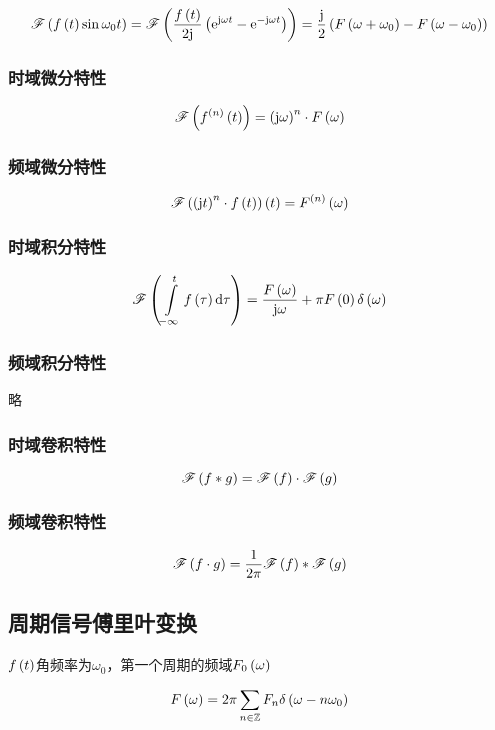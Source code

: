 \documentclass{article}
\begin{document}
\[\fourier{\ft\sin\omega_0t}
    =\fourier{\frac\ft{2\j}\pare{\e^{\j\omega t}-\e^{-\j\omega t}}}
    =\frac\j2\pare{F\pare{\omega+\omega_0}-F\pare{\omega-\omega_0}}\]

\subsubsection{时域微分特性}

\[\fourier{f^{\pare{n}}\pare{t}}=\pare{\j\omega}^n\cdot \fw\]

\subsubsection{频域微分特性}

\[\fourier{\pare{\j t}^n\cdot\ft}\pare{t}=F^{\pare{n}}\pare{\omega}\]

\subsubsection{时域积分特性}

\[\fourier{\int\limits_{-\infty}^tf\pare{\tau}\d\tau}=\frac{\fw}{\j\omega}+\pi F\pare{0}\delta\pare{\omega}\]

\subsubsection{频域积分特性}

略

\subsubsection{时域卷积特性}

\[\fourier{f\ast g}=\fourier f\cdot\fourier g\]

\subsubsection{频域卷积特性}

\[\fourier{f\cdot g}=\frac1{2\pi}\fourier f\ast\fourier g\]

\subsection{周期信号傅里叶变换}

$\ft$角频率为$\omega_0$，第一个周期的频域$F_0\pare{\omega}$

\[\fw=2\pi\sumsz F_n\delta\pare{\omega-n\omega_0}\]
\end{document}
